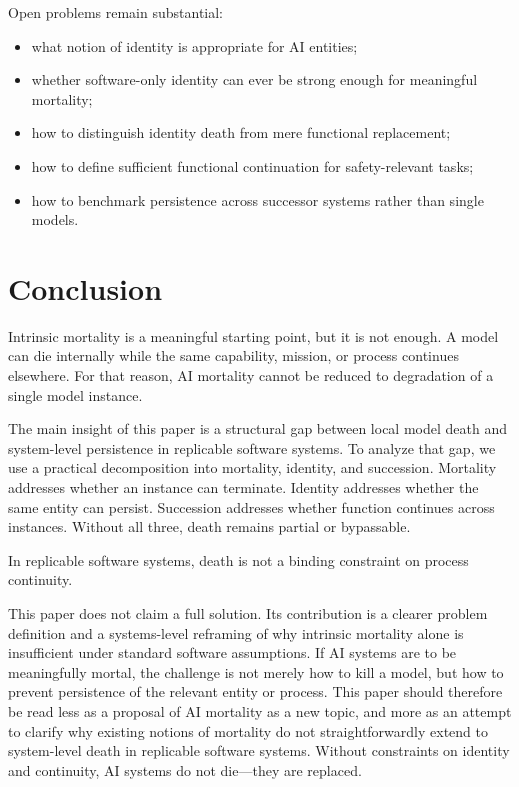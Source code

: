 \documentclass[11pt]{article}
\begin{document}
Open problems remain substantial:
\begin{itemize}
\item what notion of identity is appropriate for AI entities;
\item whether software-only identity can ever be strong enough for meaningful mortality;
\item how to distinguish identity death from mere functional replacement;
\item how to define sufficient functional continuation for safety-relevant tasks;
\item how to benchmark persistence across successor systems rather than single models.
\end{itemize}

\newpage
\section{Conclusion}

Intrinsic mortality is a meaningful starting point, but it is not enough. A model can die internally while the same capability, mission, or process continues elsewhere. For that reason, AI mortality cannot be reduced to degradation of a single model instance.

The main insight of this paper is a structural gap between local model death and system-level persistence in replicable software systems. To analyze that gap, we use a practical decomposition into mortality, identity, and succession. Mortality addresses whether an instance can terminate. Identity addresses whether the same entity can persist. Succession addresses whether function continues across instances. Without all three, death remains partial or bypassable.

In replicable software systems, death is not a binding constraint on process continuity.

This paper does not claim a full solution. Its contribution is a clearer problem definition and a systems-level reframing of why intrinsic mortality alone is insufficient under standard software assumptions. If AI systems are to be meaningfully mortal, the challenge is not merely how to kill a model, but how to prevent persistence of the relevant entity or process. This paper should therefore be read less as a proposal of AI mortality as a new topic, and more as an attempt to clarify why existing notions of mortality do not straightforwardly extend to system-level death in replicable software systems. Without constraints on identity and continuity, AI systems do not die---they are replaced.
\end{document}
